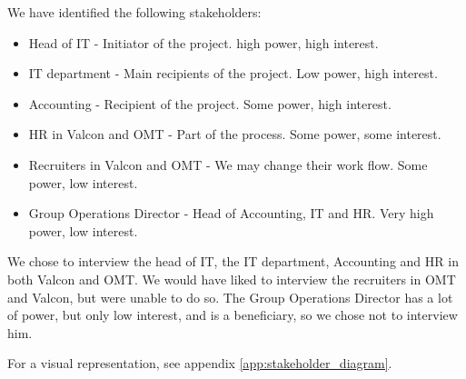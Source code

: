 We have identified the following stakeholders: 
\begin{itemize}
\item Head of IT - Initiator of the project. high power, high interest.
\item IT department - Main recipients of the project. Low power, high interest.
\item Accounting - Recipient of the project. Some power, high interest.
\item HR in Valcon and OMT - Part of the process. Some power, some interest.
\item Recruiters in Valcon and OMT - We may change their work flow. Some power, low interest.
\item Group Operations Director - Head of Accounting, IT and HR. Very high power, low interest.
\end{itemize}
We chose to interview the head of IT, the IT department, Accounting and HR in both Valcon and OMT. 
We would have liked to interview the recruiters in OMT and Valcon, but were unable to do so.
The Group Operations Director has a lot of power, but only low interest, and is a beneficiary, so we chose not to interview him.

For a visual representation, see appendix \ref{app:stakeholder_diagram}.